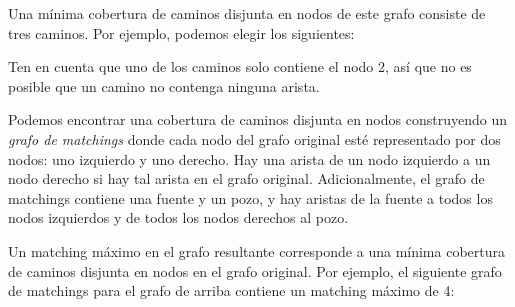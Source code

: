 Una mínima cobertura de caminos disjunta en nodos de este grafo
consiste de tres caminos. Por ejemplo, podemos elegir los siguientes:

\begin{center}
\end{center}

Ten en cuenta que uno de los caminos solo contiene el nodo 2,
así que no es posible que un camino no contenga ninguna arista.

Podemos encontrar una cobertura de caminos disjunta en nodos
construyendo un \emph{grafo de matchings} donde cada nodo del grafo
original esté representado por dos nodos: uno izquierdo y uno derecho.
Hay una arista de un nodo izquierdo a un nodo derecho si hay tal arista
en el grafo original. Adicionalmente, el grafo de matchings contiene
una fuente y un pozo, y hay aristas de la fuente a todos los nodos
izquierdos y de todos los nodos derechos al pozo.

Un matching máximo en el grafo resultante corresponde a una mínima
cobertura de caminos disjunta en nodos en el grafo original. Por ejemplo,
el siguiente grafo de matchings para el grafo de arriba contiene un
matching máximo de 4:


